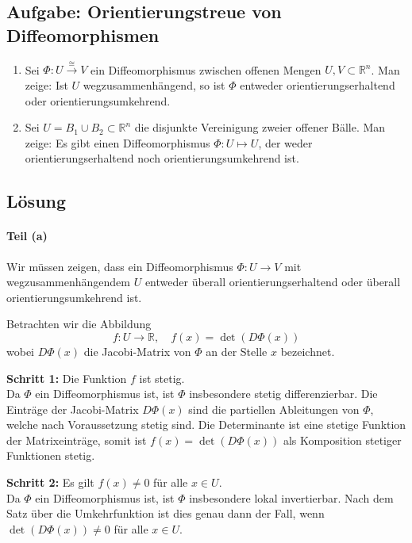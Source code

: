 \documentclass{article}
\newcommand{\R}{\mathbb{R}}
\begin{document}
\subsection*{Aufgabe: Orientierungstreue von Diffeomorphismen}

\begin{enumerate}
	\item Sei $\Phi \colon U \stackrel{\cong} \longrightarrow V$ ein Diffeomorphismus zwischen offenen Mengen $U, V \subset \R^n$. Man zeige: Ist $U$ wegzusammenhängend, so ist $\Phi$ entweder orientierungserhaltend oder orientierungsumkehrend.
	\item Sei $U=B_1\cup B_2\subset\R^n$ die disjunkte Vereinigung zweier offener Bälle. Man zeige: Es gibt einen Diffeomorphismus $\Phi \colon U \mapsto U$, der weder orientierungserhaltend noch orientierungsumkehrend ist.
\end{enumerate}

\subsection*{Lösung}

\paragraph{Teil (a)} Wir müssen zeigen, dass ein Diffeomorphismus $\Phi: U \to V$ mit wegzusammenhängendem $U$ entweder überall orientierungserhaltend oder überall orientierungsumkehrend ist.

Betrachten wir die Abbildung 
$$f: U \to \R, \quad f(x) = \det(D\Phi(x))$$
wobei $D\Phi(x)$ die Jacobi-Matrix von $\Phi$ an der Stelle $x$ bezeichnet.

\textbf{Schritt 1:} Die Funktion $f$ ist stetig.\\
Da $\Phi$ ein Diffeomorphismus ist, ist $\Phi$ insbesondere stetig differenzierbar. Die Einträge der Jacobi-Matrix $D\Phi(x)$ sind die partiellen Ableitungen von $\Phi$, welche nach Voraussetzung stetig sind. Die Determinante ist eine stetige Funktion der Matrixeinträge, somit ist $f(x) = \det(D\Phi(x))$ als Komposition stetiger Funktionen stetig.

\textbf{Schritt 2:} Es gilt $f(x) \neq 0$ für alle $x \in U$.\\
Da $\Phi$ ein Diffeomorphismus ist, ist $\Phi$ insbesondere lokal invertierbar. Nach dem Satz über die Umkehrfunktion ist dies genau dann der Fall, wenn $\det(D\Phi(x)) \neq 0$ für alle $x \in U$.
\end{document}
